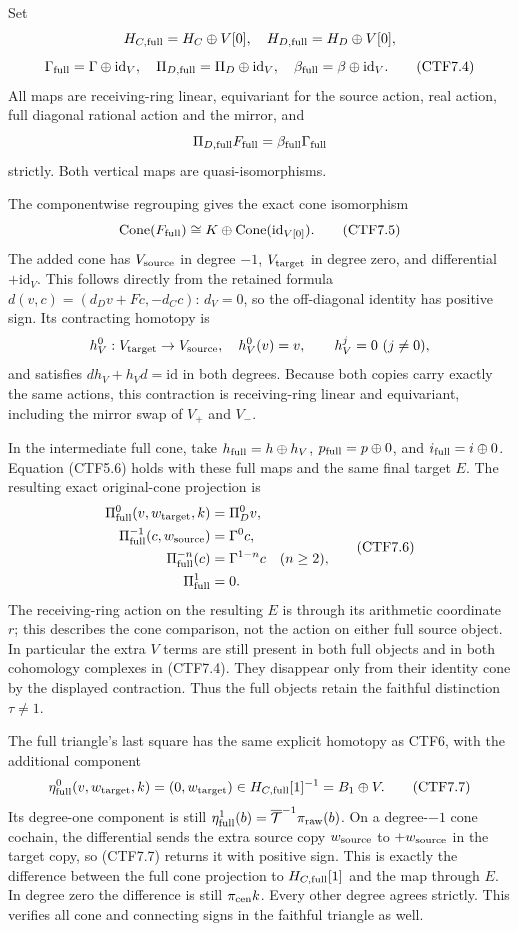 Set \[
H_{C,\rm full}=H_C\oplus V[0],\quad
H_{D,\rm full}=H_D\oplus V[0],
\] \[
\Gamma_{\rm full}=\Gamma\oplus\mathrm{id}_V,\quad
\Pi_{D,\rm full}=\Pi_D\oplus\mathrm{id}_V,\quad
\beta_{\rm full}=\beta\oplus\mathrm{id}_V.
\tag{CTF7.4}
\] All maps are receiving-ring linear, equivariant for the source
action, real action, full diagonal rational action and the mirror, and
\[
\Pi_{D,\rm full}F_{\rm full}=\beta_{\rm full}\Gamma_{\rm full}
\] strictly. Both vertical maps are quasi-isomorphisms.

The componentwise regrouping gives the exact cone isomorphism \[
\operatorname{Cone}(F_{\rm full})
\cong K\oplus\operatorname{Cone}(\mathrm{id}_{V[0]}).
\tag{CTF7.5}
\] The added cone has \(V_{\rm source}\) in degree \(-1\),
\(V_{\rm target}\) in degree zero, and differential \(+\mathrm{id}_V\).
This follows directly from the retained formula
\(d(v,c)=(d_Dv+Fc,-d_Cc)\): \(d_V=0\), so the off-diagonal identity has
positive sign. Its contracting homotopy is \[
h_V^0:V_{\rm target}\to V_{\rm source},\quad h_V^0(v)=v,
\qquad h_V^j=0\ (j\ne0),
\] and satisfies \(d h_V+h_Vd=\mathrm{id}\) in both degrees. Because
both copies carry exactly the same actions, this contraction is
receiving-ring linear and equivariant, including the mirror swap of
\(V_+\) and \(V_-\).

In the intermediate full cone, take \(h_{\rm full}=h\oplus h_V\),
\(p_{\rm full}=p\oplus0\), and \(i_{\rm full}=i\oplus0\). Equation
(CTF5.6) holds with these full maps and the same final target \(E\). The
resulting exact original-cone projection is \[
\begin{aligned}
\Pi_{\rm full}^0(v,w_{\rm target},k)&=\Pi_D^0v,\\
\Pi_{\rm full}^{-1}(c,w_{\rm source})&=\Gamma^0c,\\
\Pi_{\rm full}^{-n}(c)&=\Gamma^{1-n}c\quad(n\ge2),\\
\Pi_{\rm full}^{1}&=0 .
\end{aligned}
\tag{CTF7.6}
\] The receiving-ring action on the resulting \(E\) is through its
arithmetic coordinate \(r\); this describes the cone comparison, not the
action on either full source object. In particular the extra \(V\) terms
are still present in both full objects and in both cohomology complexes
in (CTF7.4). They disappear only from their identity cone by the
displayed contraction. Thus the full objects retain the faithful
distinction \(\tau\ne1\).

The full triangle's last square has the same explicit homotopy as CTF6,
with the additional component \[
\eta_{\rm full}^0(v,w_{\rm target},k)
=(0,w_{\rm target})\in H_{C,\rm full}[1]^{-1}
=B_1\oplus V.
\tag{CTF7.7}
\] Its degree-one component is still
\(\eta_{\rm full}^1(b)=\overline{\mathcal T}^{-1}\pi_{\rm raw}(b)\). On
a degree-\(-1\) cone cochain, the differential sends the extra source
copy \(w_{\rm source}\) to \(+w_{\rm source}\) in the target copy, so
(CTF7.7) returns it with positive sign. This is exactly the difference
between the full cone projection to \(H_{C,\rm full}[1]\) and the map
through \(E\). In degree zero the difference is still
\(\pi_{\rm cen}k\). Every other degree agrees strictly. This verifies
all cone and connecting signs in the faithful triangle as well.


